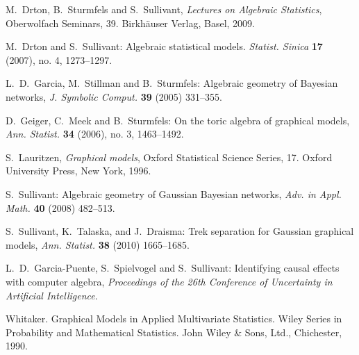 \documentclass[letterpaper]{article}
\theoremstyle{definition}
\begin{document}
\begin{thebibliography}{20}



M.~Drton, B.~Sturmfels and S.~Sullivant, \emph{Lectures on Algebraic Statistics}, 
Oberwolfach Seminars, 39. Birkh\"auser Verlag, Basel, 2009.

M.~Drton and S.~Sullivant:
Algebraic statistical models. 
{\em Statist. Sinica}  {\bf 17} (2007), no. 4, 1273--1297. 


 L.~D.~Garcia, M.~Stillman and B.~Sturmfels: 
Algebraic geometry of Bayesian networks, {\em J. Symbolic Comput.}
  {\bf 39} (2005) 331--355.
  
D.~Geiger, C.~Meek and B.~Sturmfels: On the toric algebra of graphical
models, {\em Ann. Statist.} {\bf 34} (2006), no. 3, 1463--1492.


S.~Lauritzen,  \emph{Graphical models}, Oxford Statistical Science Series, 17. Oxford University Press, New York, 1996.


 S.~Sullivant: Algebraic geometry of Gaussian Bayesian
  networks, {\em Adv. in Appl. Math.} {\bf 40} (2008) 482--513.

S.~Sullivant, K.~Talaska, and J.~Draisma: Trek separation for Gaussian
graphical models, {\em Ann. Statist.} {\bf 38} (2010) 1665--1685. 

 L.~D.~Garcia-Puente, S.~Spielvogel and S.~Sullivant: Identifying
causal effects with computer algebra, {\em Proceedings of the 26th
Conference of Uncertainty in Artificial Intelligence}.

  Whitaker.  Graphical Models in Applied Multivariate
  Statistics. Wiley Series in Probability and Mathematical Statistics. John Wiley \& Sons, Ltd., Chichester, 1990.


\end{thebibliography}
\end{document}
